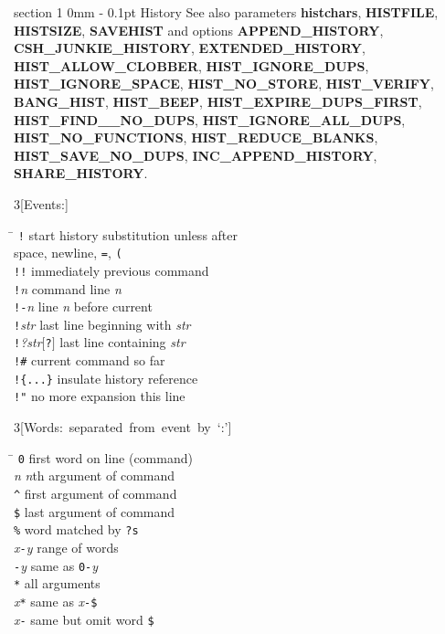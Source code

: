 \documentclass{article}
\makeatletter
\renewcommand{\section}{\@startsection
  {section}%
  {1}%
  {0mm}%
  {-\baselineskip}%
  {0.1pt}%
  {\normalfont\normalsize\scshape}} %
\newcommand\B[1]{\textbf{#1}}
\newcommand\I[1]{\textsl{#1}}
\newcommand\T[1]{\texttt{#1}}
\newcommand\Lsq{\ensuremath{\boldsymbol{[}}}
\newcommand\Rsq{\ensuremath{\boldsymbol{]}}}
\makeatother
\begin{document}
\goodbreak
\section{History}
See also parameters \B{histchars}, \B{HISTFILE}, \B{HISTSIZE},
\B{SAVEHIST} and options \B{APPEND\_\-HISTORY},
\B{CSH\_\-JUNKIE\_\-HISTORY}, \B{EXTENDED\_\-HISTORY},
\B{HIST\_\-ALLOW\_\-CLOBBER}, \B{HIST\_\-IGNORE\_\-DUPS},
\B{HIST\_\-IGNORE\_\-SPACE}, \B{HIST\_\-NO\_\-STORE},
\B{HIST\_\-VERIFY}, \B{BANG\_\-HIST}, \B{HIST\_\-BEEP},
\B{HIST\_\-EXPIRE\_\-DUPS\_\-FIRST}, \B{HIST\_\-FIND\_\_NO\_\-DUPS},
\B{HIST\_\-IGNORE\_\-ALL\_\-DUPS}, \B{HIST\_\-NO\_\-FUNCTIONS},
\B{HIST\_\-REDUCE\_\-BLANKS}, \B{HIST\_\-SAVE\_\-NO\_\-DUPS},
\B{INC\_\-APPEND\_\-HISTORY}, \B{SHARE\_\-HISTORY}.

\begin{multicols}{3}[\mbox{Events:}]
\begin{tabbing}
\hskip 60pt \= \kill
\verb.!.        \> start history substitution unless after \\
                \> space, newline, \verb!=!, \verb!(! \\
\verb.!!.       \> immediately previous command \\
\verb.!.\I{n}   \> command line \I{n} \\
\verb.!-.\I{n}  \> line \I{n} before current \\
\verb.!.\I{str} \> last line beginning with \I{str} \\
\verb.!.\I{?str}\Lsq\verb.?.\Rsq
                \> last line containing \I{str} \\
\verb.!#.       \> current command so far \\
\verb?!{...}?   \> insulate history reference \\
\verb.!".       \> no more expansion this line \\
\end{tabbing}
\end{multicols}

\begin{multicols}{3}[\mbox{Words: separated from event by `:'}]
\begin{tabbing}
\hskip 60pt \= \kill
\T{0}           \> first word on line (command) \\
\I{n}           \> \I{n\/}th argument of command \\
\verb!^!        \> first argument of command \\
\verb!$!        \> last argument of command \\
\verb!%!        \> word matched by \verb!?s! \\
\I{x}\verb!-!\I{y} \> range of words \\
\verb!-!\I{y}   \> same as \verb!0-!\I{y} \\
\verb!*!        \> all arguments \\
\I{x}\verb!*!   \> same as \I{x}\verb!-$! \\
\I{x}\verb!-!   \> same but omit word \verb!$! \\
\end{tabbing}
\end{multicols}
\end{document}
